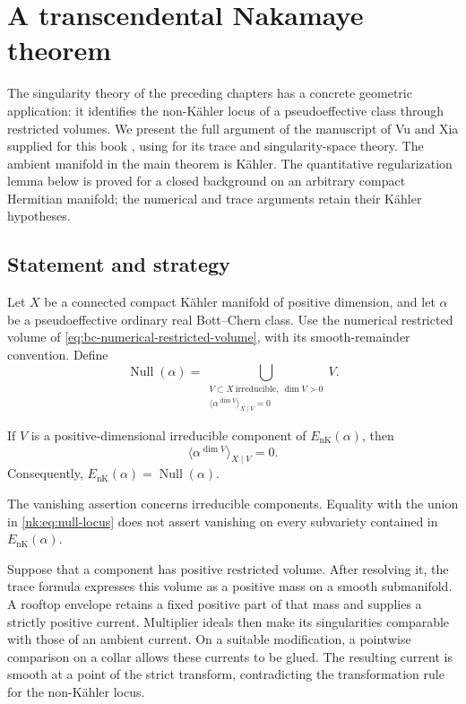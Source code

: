 \chapter{A transcendental Nakamaye theorem}
\label{chap:transcendental-nakamaye}
\providecommand{\NkRes}[1]{\operatorname{Res}_{#1}}

The singularity theory of the preceding chapters has a concrete geometric
application: it identifies the non-K\"ahler locus of a pseudoeffective
class through restricted volumes. We present the full argument of the
manuscript of Vu and Xia supplied for this book \cite{VXNull}, using
\cite{SGPT} for its trace and singularity-space theory. The ambient
manifold in the main theorem is K\"ahler. The quantitative regularization
lemma below is proved for a closed background on an arbitrary compact
Hermitian manifold; the numerical and trace arguments retain their
K\"ahler hypotheses.

\section{Statement and strategy}

Let $X$ be a connected compact K\"ahler manifold of positive dimension,
and let $\alpha$ be a pseudoeffective ordinary real Bott--Chern class.
Use the numerical restricted volume of
\eqref{eq:bc-numerical-restricted-volume}, with its smooth-remainder
convention. Define
\begin{equation}\label{nk:eq:null-locus}
 \operatorname{Null}(\alpha)
 =\bigcup_{\substack{V\subset X\ \mathrm{irreducible},\ \dim V>0\\
          \langle\alpha^{\dim V}\rangle_{X\mid V}=0}}V.
\end{equation}

\begin{theorem}\label{nk:thm:main}
If $V$ is a positive-dimensional irreducible component of
$E_{\mathrm{nK}}(\alpha)$, then
\[
 \langle\alpha^{\dim V}\rangle_{X\mid V}=0.
\]
Consequently,
$E_{\mathrm{nK}}(\alpha)=\operatorname{Null}(\alpha)$.
\end{theorem}

The vanishing assertion concerns irreducible components. Equality with
the union in \eqref{nk:eq:null-locus} does not assert vanishing on every
subvariety contained in $E_{\mathrm{nK}}(\alpha)$.

Suppose that a component has positive restricted volume. After resolving
it, the trace formula expresses this volume as a positive mass on a
smooth submanifold. A rooftop envelope retains a fixed positive part of
that mass and supplies a strictly positive current. Multiplier ideals
then make its singularities comparable with those of an ambient current.
On a suitable modification, a pointwise comparison on a collar allows
these currents to be glued. The resulting current is smooth at a point
of the strict transform, contradicting the transformation rule for the
non-K\"ahler locus.

